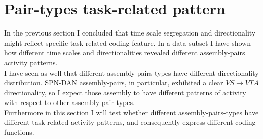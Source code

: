  \section{Pair-types task-related pattern}
 \label{sec:TaskResp}
In the previous section I concluded that time scale segregation and directionality might reflect specific task-related coding feature. In a data subset I have shown how different time scales and directionalities revealed different assembly-pairs activity patterns.\\ I have seen as well that different assembly-pairs types have different directionality distribution. SPN-DAN assembly-pairs, in particular, exhibited a clear $VS\rightarrow VTA$ directionality, so I expect those assembly to have different patterns of activity with respect to other assembly-pair types.\\Furthermore in this section I will test whether different assembly-pairs-types have different task-related activity patterns, and consequently express different coding functions.\\
